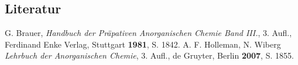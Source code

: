 \documentclass[12pt]{article}
\begin{document}
\begin{onehalfspace}
\section{Literatur}
\renewcommand{\section}[2]{}%
\begin{thebibliography}{}
G. Brauer, \textit{Handbuch der Präpativen Anorganischen Chemie Band III.}, 3. Aufl., Ferdinand Enke Verlag, Stuttgart \textbf{1981}, S. 1842.
A. F. Holleman, N. Wiberg \textit{Lehrbuch der Anorganischen Chemie}, 3. Aufl., de Gruyter, Berlin \textbf{2007}, S. 1855.
\end{thebibliography}
\end{onehalfspace}
\end{document}
